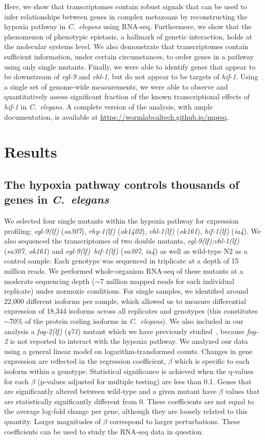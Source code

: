 \documentclass[10pt, onecolumn]{article}
\newcommand{\cel}{\emph{C.~elegans}}
\newcommand{\gene}[1]{\emph{#1}}
\newcommand{\fog}{\emph{\mbox{fog-2(lf)}}}
\newcommand{\egl}{\emph{\mbox{egl-9}(lf)}}
\newcommand{\rhy}{\emph{\mbox{rhy-1}(lf)}}
\newcommand{\vhl}{\emph{\mbox{vhl-1}(lf)}}
\newcommand{\eglvhl}{\emph{\mbox{egl-9(lf);vhl-1(lf)}}}
\newcommand{\eglhif}{\emph{\mbox{egl-9(lf)}~\mbox{hif-1(lf)}}}
\newcommand{\hif}{\emph{\mbox{hif-1(lf)}}}
\begin{document}
Here, we show that transcriptomes contain robust signals that can be
used to infer relationships between genes in complex metazoans by reconstructing
the hypoxia pathway in \cel{} using RNA-seq.
Furthermore, we show that the phenomenon of phenotypic epistasis, a hallmark of
genetic interaction, holds at the molecular systems level.
We also demonstrate that transcriptomes contain sufficient information, under
certain circumstances, to order genes in a pathway using only single mutants.
Finally, we were able to identify genes that appear to be downstream of \gene{egl-9}
and \gene{vhl-1}, but do not appear to be targets of \gene{hif-1}.
Using a single set of genome-wide measurements, we were able to observe and
quantitatively assess  significant fraction of the known transcriptional
effects of \gene{hif-1} in \cel{}.
A complete version of the analysis, with ample documentation, is available at
\url{https://wormlabcaltech.github.io/mprsq}.

\section*{Results}
\subsection*{The hypoxia pathway controls thousands of genes in \cel{}}
\label{sub:summary}

We selected four single mutants within the hypoxia pathway for expression profiling:
\egl{} (\emph{sa307}), \rhy{} (\emph{ok1402}), \vhl{} (\emph{ok161}), \hif{} (\emph{ia4}).
We also sequenced the transcriptomes of two double mutants, \eglvhl{} (\emph{sa307},
\emph{ok161}) and \eglhif{} (\emph{sa307}, \emph{ia4}) as well as wild-type N2 as
a control sample. Each genotype  was sequenced in triplicate at a depth of 15
million reads. We performed whole-organism RNA-seq of these mutants at a moderate
sequencing depth ($\sim7$ million mapped reads for each individual replicate)
under normoxic conditions. For single samples, we identified around 22,000 different
isoforms per sample, which allowed us to measure differential expression of 18,344
isoforms across all replicates and genotypes (this constitutes  $\sim$70\% of
the protein coding isoforms in \cel{}).
We also included in our analysis a \fog{} (\emph{q71}) mutant which we have previously
studied~\cite{Angeles-Albores2016a}, because \gene{fog-2} is not reported to
interact with the hypoxia pathway.
We analyzed our data using a general linear model on
logarithm-transformed counts. Changes in gene expression are reflected in the
regression coefficient, $\beta$ which is specific to each isoform within a genotype.
Statistical significance is achieved when the q-values for each $\beta$ (p-values
adjusted for multiple testing) are less than 0.1. Genes that are significantly
altered between wild-type and a given mutant have $\beta$ values that are
statistically significantly different from 0.  These coefficients are not equal
to the average log-fold change per gene, although they are loosely related to
this quantity. Larger magnitudes of $\beta$ correspond to larger perturbations.
These coefficients can be used to study the RNA-seq data in question.
\end{document}
